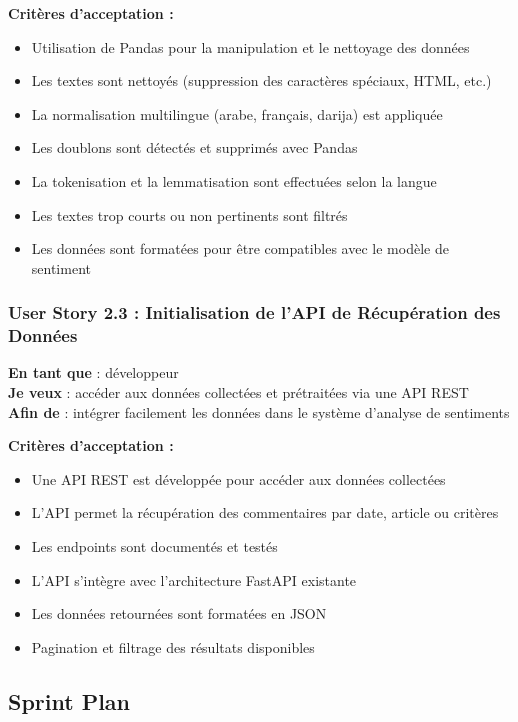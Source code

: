 \textbf{Critères d'acceptation :}
\begin{itemize}
    \item Utilisation de Pandas pour la manipulation et le nettoyage des données
    \item Les textes sont nettoyés (suppression des caractères spéciaux, HTML, etc.)
    \item La normalisation multilingue (arabe, français, darija) est appliquée
    \item Les doublons sont détectés et supprimés avec Pandas
    \item La tokenisation et la lemmatisation sont effectuées selon la langue
    \item Les textes trop courts ou non pertinents sont filtrés
    \item Les données sont formatées pour être compatibles avec le modèle de sentiment
\end{itemize}

\subsubsection{User Story 2.3 : Initialisation de l'API de Récupération des Données}

\textbf{En tant que} : développeur \\
\textbf{Je veux} : accéder aux données collectées et prétraitées via une API REST \\
\textbf{Afin de} : intégrer facilement les données dans le système d'analyse de sentiments

\textbf{Critères d'acceptation :}
\begin{itemize}
    \item Une API REST est développée pour accéder aux données collectées
    \item L'API permet la récupération des commentaires par date, article ou critères
    \item Les endpoints sont documentés et testés
    \item L'API s'intègre avec l'architecture FastAPI existante
    \item Les données retournées sont formatées en JSON
    \item Pagination et filtrage des résultats disponibles
\end{itemize}

\subsection{Sprint Plan}

